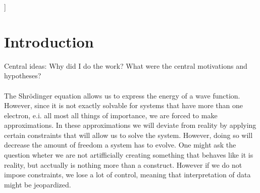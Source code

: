 \documentclass[twoside,twocolumn,9pt]{article}
\begin{document}
  ]

\renewcommand*\rmdefault{bch}\normalfont\upshape
\rmfamily
\section*{}
\vspace{-1cm}










\section{Introduction}

Central ideas: Why did I do the work? What were the central motivations and hypotheses?

\paragraph*{}
The Shrödinger equation allows us to express the energy of a wave function. However, since it is not exactly solvable for systems that 
have more than one electron, e.i. all most all things of importance, we are forced to make approximations. In these approximations we will
deviate from reality by applying certain constraints that will allow us to solve the system. However, doing so will decrease the amount
of freedom a system has to evolve. One might ask the question wheter we are not artifficially creating something that behaves like it is 
reality, but acctually is nothing more than a construct. However if we do not impose constraints, we lose a lot of control, meaning that 
interpretation of data might be jeopardized. 
\end{document}
